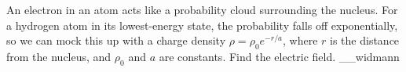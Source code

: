 An electron in an atom acts like a probability cloud surrounding the
nucleus. For a hydrogen atom in its lowest-energy state, the probability
falls off exponentially, so we can mock this up with a
charge density $\rho=\rho_0 e^{-r/a}$, where $r$ is the distance
from the nucleus, and $\rho_0$ and $a$ are constants.
Find the electric field.
__widmann
\answercheck
